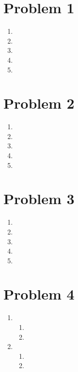\documentclass{article}
\begin{document}
\renewcommand{\labelenumi}{(\alph{enumi})}
\renewcommand{\labelenumii}{(\roman{enumii})}
\author{Danny Zhu \& Tianhui Cai}
\maketitle

\section*{Problem 1}
\begin{enumerate}
\item 
\item 
\item 
\item 
\item 
\end{enumerate}
\section*{Problem 2}
\begin{enumerate}
\item 
\item 
\item 
\item 
\item 
\end{enumerate}
\section*{Problem 3}
\begin{enumerate}
\item 
\item 
\item 
\item 
\item 
\end{enumerate}
\section*{Problem 4}
\begin{enumerate}
\item 
  \begin{enumerate}
  \item 
  \item 
  \end{enumerate}
\item 
  \begin{enumerate}
  \item 
  \item 
  \end{enumerate}
\end{enumerate}
\end{document}
